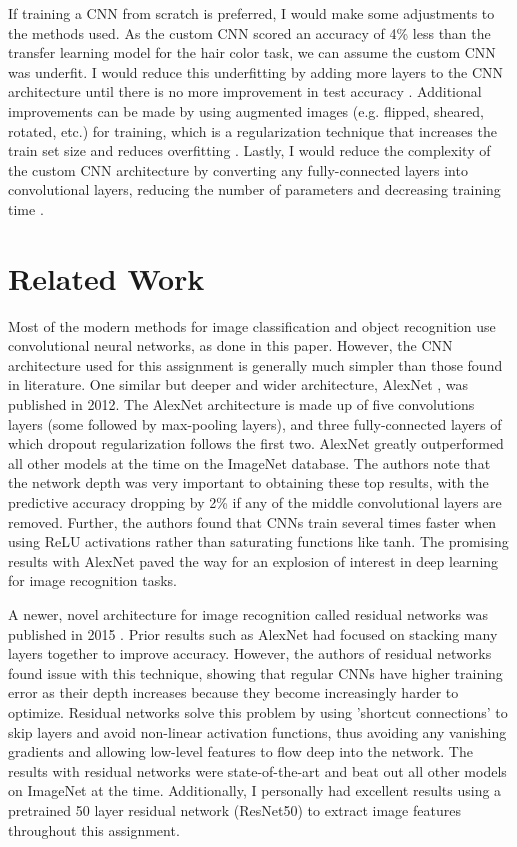 \documentclass[10pt,twocolumn,letterpaper]{article}
\begin{document}
If training a CNN from scratch is preferred, I would make some adjustments to the methods used. As the custom CNN scored an accuracy of 4\% less than the transfer learning model for the hair color task, we can assume the custom CNN was underfit. I would reduce this underfitting by adding more layers to the CNN architecture until there is no more improvement in test accuracy \cite{DBLP:journals/corr/abs-1206-5533}.  Additional improvements can be made by using augmented images (e.g. flipped, sheared, rotated, etc.) for training, which is a regularization technique that increases the train set size and reduces overfitting \cite{DBLP:journals/corr/abs-1712-04621}. Lastly, I would reduce the complexity of the custom CNN architecture by converting any fully-connected layers into convolutional layers, reducing the number of parameters and decreasing training time \cite{karpathy_2018_cnn}.

\section{Related Work}\label{related_work}

Most of the modern methods for image classification and object recognition use convolutional neural networks, as done in this paper. However, the CNN architecture used for this assignment is generally much simpler than those found in literature. One similar but deeper and wider architecture, AlexNet \cite{krizhevsky2012imagenet}, was published in 2012. The AlexNet architecture is made up of five convolutions layers (some followed by max-pooling layers), and three fully-connected layers of which dropout regularization follows the first two. AlexNet greatly outperformed all other models at the time on the ImageNet database. The authors note that the network depth was very important to obtaining these top results, with the predictive accuracy dropping by 2\% if any of the middle convolutional layers are removed. Further, the authors found that CNNs train several times faster when using ReLU activations rather than saturating functions like tanh. The promising results with AlexNet paved the way for an explosion of interest in deep learning for image recognition tasks. 

A newer, novel architecture for image recognition called residual networks was published in 2015 \cite{DBLP:journals/corr/HeZRS15}. Prior results such as AlexNet had focused on stacking many layers together to improve accuracy. However, the authors of residual networks found issue with this technique, showing that regular CNNs have higher training error as their depth increases because they become increasingly harder to optimize. Residual networks solve this problem by using 'shortcut connections' to skip layers and avoid non-linear activation functions, thus avoiding any vanishing gradients and allowing low-level features to flow deep into the network. The results with residual networks were state-of-the-art and beat out all other models on ImageNet at the time. Additionally, I personally had excellent results using a pretrained 50 layer residual network (ResNet50) to extract image features throughout this assignment.
\end{document}
